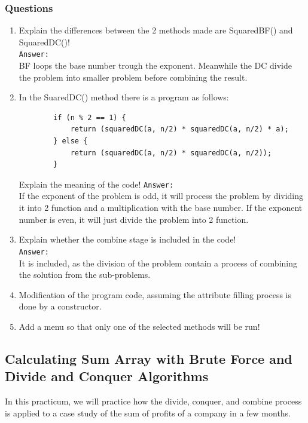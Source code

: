 \documentclass[12pt,titlepage]{article}
\begin{document}
\subsubsection{Questions}

\begin{enumerate}
    \item Explain the differences between the 2 methods made are SquaredBF() and SquaredDC()!
    \mbox{}\\
    \texttt{Answer: }
    \mbox{}\\
    BF loops the base number trough the exponent. Meanwhile the DC divide the problem into smaller problem before combining the result.
    \item In the SuaredDC() method there is a program as follows:
    \begin{verbatim}
        if (n % 2 == 1) {
            return (squaredDC(a, n/2) * squaredDC(a, n/2) * a);
        } else {
            return (squaredDC(a, n/2) * squaredDC(a, n/2));
        }
    \end{verbatim}
    Explain the meaning of the code!
    \texttt{Answer: }
    \mbox{}\\
    If the exponent of the problem is odd, it will process the problem by dividing it into 2 function and a multiplication with the base number. If the exponent number is even, it will just divide the problem into 2 function.
    \item Explain whether the combine stage is included in the code!
    \mbox{}\\
    \texttt{Answer: }
    \mbox{}\\
    It is included, as the division of the problem contain a process of combining the solution from the sub-problems.
    \item Modification of the program code, assuming the attribute filling process is done by a constructor.
    \item Add a menu so that only one of the selected methods will be run!
\end{enumerate}

\subsection{Calculating Sum Array with Brute Force and Divide and Conquer Algorithms}
In this practicum, we will practice how the divide, conquer, and combine process is applied to a case study of the sum of profits of a company in a few months.
\end{document}
